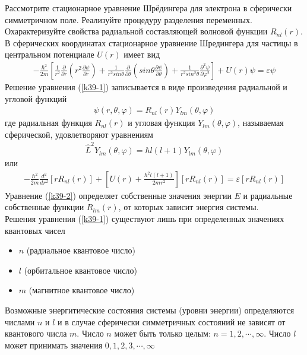 \documentclass[__main__.tex]{subfiles}
\begin{document}
	
	Рассмотрите стационарное уравнение Шрёдингера для электрона в сферически симметричном поле. Реализуйте процедуру разделения переменных. Охарактеризуйте свойства радиальной составляющей волновой функции $R_{nl}(r)$.\\ 
	
	В сферических координатах стационарное уравнение Шредингера для частицы в центральном потенциале $U(r)$ имеет вид
	\begin{gather}
	\label{k39-1}
	-\frac{\hbar^2}{2m}\left[\frac{1}{r^2}\frac{\partial}{\partial r}\left(r^2\frac{\partial \psi}{\partial r}\right)+\frac{1}{r^2sin\theta}\frac{\partial}{\partial\theta}\left(sin\theta\frac{\partial \psi}{\partial \theta}\right)+\frac{1}{r^2sin^2\theta}\frac{\partial^2\psi}{\partial \varphi^2}\right]+U(r)\psi = \varepsilon\psi
	\end{gather}
	Решение уравнения (\ref{k39-1}) записывается в виде произведения радиальной и угловой функций
	\begin{gather*}
	\psi(r,\theta,\varphi) = R_{nl}(r)Y_{lm}(\theta,\varphi)
	\end{gather*}
	где радиальная функция $R_{nl}(r)$ и угловая функция $Y_{lm}(\theta,\varphi)$, называемая сферической, удовлетворяют уравнениям
	\begin{gather*}
	\hat{L}^2Y_{lm}(\theta,\varphi) = \hbar l(l+1)Y_{lm}(\theta,\varphi)
	\end{gather*}
	или
	\begin{gather}
		\label{k39-2}
		-\frac{\hbar^2}{2m}\frac{d^2}{dr^2}\left[rR_{nl}(r)\right]+\left[U(r)+\frac{\hbar^2 l(l+1)}{2mr^2}\right]\left[r R_{nl}(r)\right] = \varepsilon\left[rR_{nl}(r)\right]
	\end{gather}
	Уравнение (\ref{k39-2}) определяет собственные значения энергии $E$ и радиальные собственные функции $R_{lm}(r)$, от которых зависит энергия системы.\\
	Решения уравнения (\ref{k39-1}) существуют лишь при определенных значениях квантовых чисел
	\begin{itemize}
		\item $n$ (радиальное квантовое число)
		\item $l$ (орбитальное квантовое число)
		\item $m$ (магнитное квантовое число)
	\end{itemize} 
	Возможные энергитические состояния системы (уровни энергии) определяются числами $n$ и $l$ и в случае сферически симметричных состояний не зависят от квантового числа $m$. Число $n$ может быть только целым: $n = 1,2,\cdots, \infty$. Число $l$ может принимать значения $0,1,2,3,\cdots, \infty$
	
\end{document}
